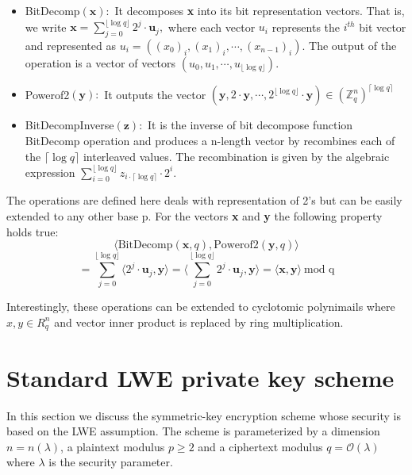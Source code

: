 \documentclass[10pt,journal,compsoc]{IEEEtran}
\theoremstyle{definition}
\begin{document}
\begin{itemize}
\item BitDecomp$\left(\textbf{x}\right)\colon$ It decomposes \textbf{x} into its bit representation vectors. That is, we write $\textbf{x} = \sum_{j=0}^{\lfloor \log q \rfloor} 2^j\cdot\textbf{u}_j,$ where each vector $u_i$ represents the $i^{th}$ bit vector and represented as $u_i = \left( (x_0)_i,(x_1)_i,\cdots,\left(x_{n-1}\right)_i\right)$. The output of the operation is a vector of vectors $\left(u_0,u_1,\cdots,u_{\lfloor \log q \rfloor}  \right)$.

\item Powerof2$\left(\textbf{y}\right)\colon$ It outputs the vector $\left( \textbf{y}, 2\cdot\textbf{y},\cdots,2^{\lfloor \log q \rfloor}\cdot \textbf{y} \right) \in \left(\mathbb{Z}_q^n\right)^{\lceil \log q \rceil}$ 

\item BitDecompInverse$\left(\textbf{z}\right)\colon$ It is the inverse of bit decompose function BitDecomp operation and produces a n-length vector by recombines each of the $\lceil \log q \rceil$ interleaved values. The recombination is given by the algebraic expression $\sum_{i=0}^{\lfloor \log q \rfloor}z_{i\cdot\lceil \log q \rceil}\cdot 2^i$.
\end{itemize}

The operations are defined here deals with representation of 2's but can be easily extended to any other base p. For the vectors \textbf{x} and \textbf{y} the following property holds true:
$$\langle \textrm{BitDecomp}\left( \textbf{x},q \right), \textrm{Powerof2}\left( \textbf{y},q \right) \rangle$$
$$= \sum_{j=0}^{\lfloor \log q \rfloor} \langle 2^j\cdot\textbf{u}_j,\textbf{y}\rangle = \langle \sum_{j=0}^{\lfloor \log q \rfloor} 2^j\cdot \textbf{u}_j,\textbf{y} \rangle = \langle \textbf{x},\textbf{y}\rangle \ \textrm{mod q}$$

Interestingly, these operations can be extended to cyclotomic polynimails where $x,y \in R_q^n$ and vector inner product is replaced by ring multiplication. 

\section{Standard LWE private key scheme}

In this section we discuss the symmetric-key encryption scheme whose security is based on the LWE assumption. The scheme is parameterized by a dimension $n = n(\lambda)$, a plaintext modulus $p \geq 2$ and a ciphertext modulus $q = \mathcal{O}\left(\lambda \right)$ where $\lambda$ is the security parameter.
\end{document}
